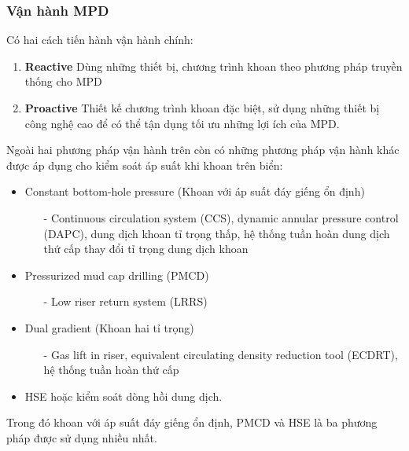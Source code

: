 \documentclass[12pt,a4paper]{article}
\begin{document}
	\subsubsection{Vận hành MPD}
		Có hai cách tiến hành vận hành chính:
		\begin{enumerate}
			\item \textbf{Reactive} Dùng những thiết bị, chương trình khoan theo phương pháp truyền thống cho MPD
			\item \textbf{Proactive} Thiết kế chương trình khoan đặc biệt, sử dụng những thiết bị công nghệ cao để có thể tận dụng tối ưu những lợi ích của MPD.
		\end{enumerate}
		Ngoài hai phương pháp vận hành trên còn có những phương pháp vận hành khác được áp dụng cho kiểm soát áp suất khi khoan trên biển:
		\begin{itemize}
			\item Constant bottom-hole pressure (Khoan với áp suất đáy giếng ổn định)
			\begin{itemize}
				\item[-] Continuous circulation system (CCS), dynamic annular pressure control (DAPC), dung dịch khoan tỉ trọng thấp, hệ thống tuần hoàn dung dịch thứ cấp thay đổi tỉ trọng dung dịch khoan
			\end{itemize}
			\item Pressurized mud cap drilling (PMCD)
			\begin{itemize}
				\item[-] Low riser return system (LRRS)
			\end{itemize}
			\item Dual gradient (Khoan hai tỉ trọng)
			\begin{itemize}
				\item[-] Gas lift in riser, equivalent circulating density reduction tool (ECDRT), hệ thống tuần hoàn thứ cấp
			\end{itemize}
			\item HSE hoặc kiểm soát dòng hồi dung dịch.
		\end{itemize}
		Trong đó khoan với áp suất đáy giếng ổn định, PMCD và HSE là ba phương pháp được sử dụng nhiều nhất.
\end{document}
